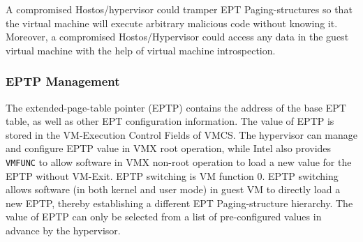 A compromised Hostos/hypervisor could tramper EPT Paging-structures so that the virtual machine will execute arbitrary malicious code without knowing it. 
Moreover, a compromised Hostos/Hypervisor could access any data in the guest virtual machine with the help of virtual machine introspection.

\subsubsection{EPTP Management}%
\label{ssub:eptp_management}
The extended-page-table pointer (EPTP) contains the address of the base EPT table, as well as other EPT configuration information. 
The value of EPTP is stored in the VM-Execution Control Fields of VMCS. 
The hypervisor can manage and configure EPTP value in VMX root operation, while Intel also provides \verb|VMFUNC| to allow software in VMX non-root operation to load a new value for the EPTP without VM-Exit.
EPTP switching is VM function 0. EPTP switching allows software (in both kernel and user mode) in guest VM to directly load a new EPTP, thereby establishing a different EPT Paging-structure hierarchy. 
The value of EPTP can only be selected from a list of pre-configured values in advance by the hypervisor. 





